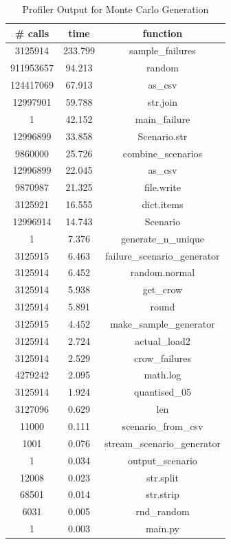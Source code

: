\documentclass[a4paper,oneside,12pt]{report}
\begin{document}
\begin{table}[htbp]
\caption{Profiler Output for Monte Carlo Generation}
\label{table_profile_mc}
\centering
\begin{tabular}{c||c||c}
\bfseries \# calls & \bfseries time  & \bfseries function  \\ 
\hline \hline
3125914  &  233.799  &  sample\_failures  \\ 
911953657  &  94.213  &  random  \\ 
124417069  &  67.913  &  as\_csv  \\ 
12997901  &  59.788  &  str.join  \\ 
1  &  42.152  &  main\_failure  \\ 
12996899  &  33.858  &  Scenario.str  \\ 
9860000  &  25.726  &  combine\_scenarios  \\ 
12996899  &  22.045  &  as\_csv  \\ 
9870987  &  21.325  &  file.write  \\ 
3125921  &  16.555  &  dict.items  \\ 
12996914  &  14.743  &  Scenario  \\ 
1  &  7.376  &  generate\_n\_unique  \\ 
3125915  &  6.463  &  failure\_scenario\_generator  \\ 
3125914  &  6.452  &  random.normal  \\ 
3125914  &  5.938  &  get\_crow  \\ 
3125914  &  5.891  &  round  \\ 
3125915  &  4.452  &  make\_sample\_generator  \\ 
3125914  &  2.724  &  actual\_load2  \\ 
3125914  &  2.529  &  crow\_failures  \\ 
4279242  &  2.095  &  math.log  \\ 
3125914  &  1.924  &  quantised\_05  \\ 
3127096  &  0.629  &  len  \\ 
11000  &  0.111  &  scenario\_from\_csv  \\ 
1001  &  0.076  &  stream\_scenario\_generator  \\ 
1  &  0.034  &  output\_scenario  \\ 
12008  &  0.023  &  str.split  \\ 
68501  &  0.014  &  str.strip  \\ 
6031  &  0.005  &  rnd\_random  \\ 
1  &  0.003  &  main.py  \\ 

\end{tabular}
\end{table}
\end{document}
